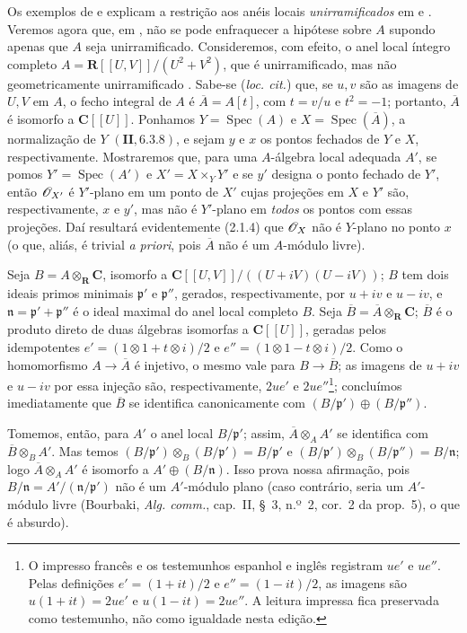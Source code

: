 \begin{env}[11.7.5]
\label{IV.11.7.5}
Os exemplos de 
e  explicam
a restrição aos anéis locais
\emph{unirramificados} em
 e
. Veremos agora
que, em ,
não se pode enfraquecer a
hipótese sobre $A$ supondo
apenas que $A$ seja
unirramificado. Consideremos,
com efeito, o anel local
íntegro completo
$A=\mathbf R[[U,V]]/(U^2+V^2)$,
que é unirramificado, mas
não geometricamente
unirramificado
.
Sabe-se (\emph{loc. cit.})
que, se $u,v$ são as imagens
de $U,V$ em $A$, o fecho
integral de $A$ é
$\overline A=A[t]$, com
$t=v/u$ e $t^2=-1$;
portanto, $\overline A$ é
isomorfo a $\mathbf C[[U]]$.
Ponhamos
$Y=\operatorname{Spec}(A)$
e $X=\operatorname{Spec}(\overline A)$,
a normalização de $Y$
$(\mathbf{II},6.3.8)$, e sejam
$y$ e $x$ os pontos fechados
de $Y$ e $X$, respectivamente.
Mostraremos que, para uma
$A$-álgebra local adequada
$A'$, se pomos
$Y'=\operatorname{Spec}(A')$
e $X'=X\times_Y Y'$ e se
$y'$ designa o ponto fechado
de $Y'$, então $\mathscr{O}_{X'}$
é $Y'$-plano em um ponto de
$X'$ cujas projeções em $X$
e $Y'$ são, respectivamente,
$x$ e $y'$, mas não é
$Y'$-plano em \emph{todos}
os pontos com essas projeções.
Daí resultará evidentemente
(2.1.4) que $\mathscr{O}_X$ não
é $Y$-plano no ponto $x$
(o que, aliás, é trivial
\emph{a priori}, pois
$\overline A$ não é um
$A$-módulo livre).

Seja $B=A\otimes_{\mathbf R}
\mathbf C$, isomorfo a
$\mathbf C[[U,V]]/
((U+iV)(U-iV))$; $B$ tem
dois ideais primos minimais
$\mathfrak p'$ e $\mathfrak p''$,
gerados, respectivamente,
por $u+iv$ e $u-iv$, e
$\mathfrak n=\mathfrak p'
+\mathfrak p''$ é o ideal
maximal do anel local completo
$B$. Seja
$\overline B=\overline A
\otimes_{\mathbf R}\mathbf C$;
$\overline B$ é o produto
direto de duas álgebras
isomorfas a $\mathbf C[[U]]$,
geradas pelos idempotentes
$e'=(1\otimes1+t\otimes i)/2$
e $e''=(1\otimes1-t\otimes i)/2$.
Como o homomorfismo
$A\to\overline A$ é injetivo,
o mesmo vale para
$B\to\overline B$; as imagens
de $u+iv$ e $u-iv$ por essa
injeção são, respectivamente,
$2ue'$ e $2ue''$\footnote{O
impresso francês e os
testemunhos espanhol e inglês
registram $ue'$ e $ue''$.
Pelas definições
$e'=(1+it)/2$ e $e''=(1-it)/2$,
as imagens são
$u(1+it)=2ue'$ e
$u(1-it)=2ue''$. A leitura
impressa fica preservada
como testemunho, não como
igualdade nesta edição.};
concluímos imediatamente
que $\overline B$ se identifica
canonicamente com
$(B/\mathfrak p')\oplus
(B/\mathfrak p'')$.

Tomemos, então, para $A'$
o anel local $B/\mathfrak p'$;
assim, $\overline A\otimes_A A'$
se identifica com
$\overline B\otimes_B A'$.
Mas temos
$(B/\mathfrak p')\otimes_B
(B/\mathfrak p')=B/\mathfrak p'$
e $(B/\mathfrak p')\otimes_B
(B/\mathfrak p'')=B/\mathfrak n$;
logo $\overline A\otimes_A A'$
é isomorfo a
$A'\oplus(B/\mathfrak n)$.
Isso prova nossa afirmação,
pois $B/\mathfrak n
=A'/(\mathfrak n/\mathfrak p')$
não é um $A'$-módulo plano
(caso contrário, seria um
$A'$-módulo livre (Bourbaki,
\emph{Alg. comm.}, cap.~II,
\S~3, n.º~2, cor.~2 da
prop.~5), o que é absurdo).
\end{env}

